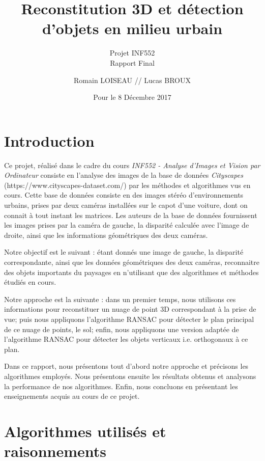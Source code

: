 \documentclass[titlepage,11pt,a4paper]{article}
\title[Projet INF552]{Reconstitution 3D et détection d’objets en milieu urbain}
\subtitle{Projet INF552 \\ Rapport Final}
\author{ Romain \textsc{LOISEAU} // Lucas \textsc{BROUX}}
\date{Pour le 8 Décembre 2017}
\begin{document}
\maketitle

\newpage 

\newpage \tableofcontents

\newpage \section{Introduction}
\par Ce projet, réalisé dans le cadre du cours \emph{INF552 - Analyse d'Images et Vision par Ordinateur} consiste en l'analyse des images de la base de données \emph{Cityscapes} (https://www.cityscapes-dataset.com/) par les méthodes et algorithmes vus en cours. Cette base de données consiste en des images stéréo d'environnements urbains, prises par deux caméras installées sur le capot d'une voiture, dont on connait à tout instant les matrices. Les auteurs de la base de données fournissent les images prises par la caméra de gauche, la disparité calculée avec l'image de droite, ainsi que les informations géométriques des deux caméras.
\par Notre objectif est le suivant : étant donnés une image de gauche, la disparité correspondante, ainsi que les données géométriques des deux caméras, reconnaitre des objets importants du paysages en n'utilisant que des algorithmes et méthodes étudiés en cours.
\par Notre approche est la suivante : dans un premier temps, nous utilisons ces informations pour reconstituer un nuage de point 3D correspondant à la prise de vue; puis nous appliquons l'algorithme RANSAC pour détecter le plan principal de ce nuage de points, le sol; enfin, nous appliquons une version adaptée de l'algorithme RANSAC pour détecter les objets verticaux i.e. orthogonaux à ce plan.
\par Dans ce rapport, nous présentons tout d'abord notre approche et précisons les algorithmes employés. Nous présentons ensuite les résultats obtenus et analysons la performance de nos algorithmes. Enfin, nous concluons en présentant les enseignements acquis au cours de ce projet.


\newpage \section{Algorithmes utilisés et raisonnements}
\end{document}
